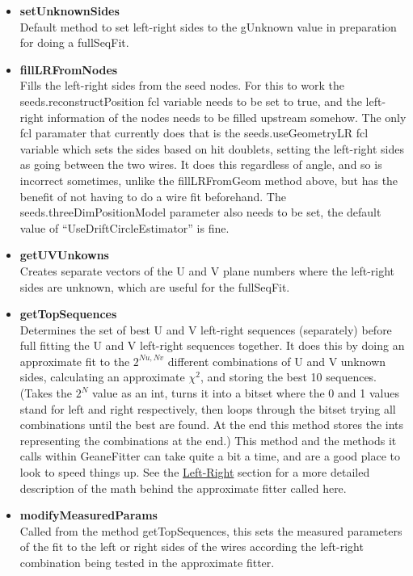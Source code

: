 \begin{enumerate}
\begin{itemize}
          \item{\bf{setUnknownSides}} \\ 
          Default method to set left-right sides to the gUnknown value in preparation for doing a fullSeqFit.

          \item{\bf{fillLRFromNodes}} \\ 
          Fills the left-right sides from the seed nodes. For this to work the seeds.reconstructPosition fcl variable needs to be set to true, and the left-right information of the nodes needs to be filled upstream somehow. The only fcl paramater that currently does that is the seeds.useGeometryLR fcl variable which sets the sides based on hit doublets, setting the left-right sides as going between the two wires. It does this regardless of angle, and so is incorrect sometimes, unlike the fillLRFromGeom method above, but has the benefit of not having to do a wire fit beforehand. The seeds.threeDimPositionModel parameter also needs to be set, the default value of ``UseDriftCircleEstimator'' is fine.

          \item{\bf{getUVUnkowns}} \\
          Creates separate vectors of the U and V plane numbers where the left-right sides are unknown, which are useful for the fullSeqFit.

          \item{\bf{getTopSequences}} \\
          Determines the set of best U and V left-right sequences (separately) before full fitting the U and V left-right sequences together. It does this by doing an approximate fit to the $2^{Nu,Nv}$ different combinations of U and V unknown sides, calculating an approximate $\chi^{2}$, and storing the best 10 sequences. (Takes the $2^{N}$ value as an int, turns it into a bitset where the 0 and 1 values stand for left and right respectively, then loops through the bitset trying all combinations until the best are found. At the end this method stores the ints representing the combinations at the end.) This method and the methods it calls within GeaneFitter can take quite a bit a time, and are a good place to look to speed things up. See the \hyperref[sec:LR]{Left-Right} section for a more detailed description of the math behind the approximate fitter called here.

          \item{\bf{modifyMeasuredParams}} \\
          Called from the method getTopSequences, this sets the measured parameters of the fit to the left or right sides of the wires according the left-right combination being tested in the approximate fitter.


\end{itemize}
\end{enumerate}
